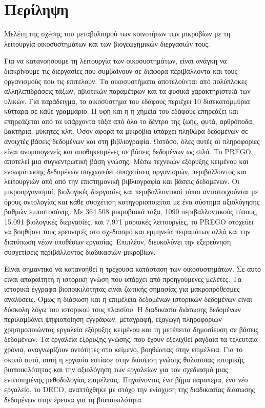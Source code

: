 \documentclass[11pt]{article}
\begin{document}
\section*{Περίληψη}
{\LARGE Μελέτη της σχέσης του μεταβολισμού των κοινοτήτων των μικροβίων με τη λειτουργία οικοσυστημάτων και των βιογεωχημικών διεργασιών τους.}


\vspace{1cm}

Για να κατανοήσουμε τη λειτουργία των οικοσυστημάτων, είναι ανάγκη να διακρίνουμε
τις διεργασίες που συμβαίνουν σε διάφορα περιβάλλοντα και τους οργανισμούς
που τις επιτελούν. Τα οικοσυστήματα αποτελούνται από πολύπλοκες αλληλεπιδράσεις τάξων,
αβιοτικών παραμέτρων και τα φυσικά χαρακτηριστικά των υλικών. Για παράδειγμα,
το οικοσύστημα του εδάφους περιέχει 10 δισεκατομμύρια κύτταρα σε κάθε γραμμάριο. Η υφή και η
η χημεία του εδάφους επηρεάζει και επηρεάζεται από τα υπάρχοντα τάξα από όλο το
δέντρο της ζωής, φυτά, αρθρόποδα, βακτήρια, μύκητες κλπ. Όσον αφορά τα μικρόβια
υπάρχει πληθώρα δεδομένων σε ανοιχτές βάσεις δεδομένων και στη
βιβλιογραφία. Ωστόσο, όλες αυτές οι πληροφορίες είναι ανομοιογενείς και αποθηκευμένες σε 
βάσεις δεδομένων ως σιλό. Το \textlatin{PREGO}, αποτελεί μια συγκεντρωτική βάση γνώσης. Μέσω
τεχνικών εξόρυξης κειμένου και ενσωμάτωσης δεδομένων συγχωνεύει 
συσχετίσεις οργανισμών, περιβάλλοντος και λειτουργιών από
από την επιστημονική βιβλιογραφία και βάσεις δεδομένων. 
Οι μικροοργανισμοί, βιολογικές διεργασίες και περιβαλλοντικοί τύποι αντιστοιχούνται
με όρους οντολογίας και κάθε συσχέτιση κατηγοριοποιείται με ένα σύστημα αξιολόγησης 
βαθμών εμπιστοσύνης.
Με 364.508 μικροβιακά τάξα, 1090 περιβαλλοντικούς τύπους, 15.091 βιολογικές διεργασίες,
και 7.971 μοριακές λειτουργίες, το \textlatin{PREGO} στοχεύει να βοηθήσει τους ερευνητές στο 
σχεδιασμό και ερμηνεία πειραμάτων αλλά και την διατύπωση νέων υποθέσων εργασίας. Επιπλέον, διευκολύνει την εξερεύνηση
συσχετίσεις περιβάλλοντος-διαδικασιών-μικροβίων.

Είναι σημαντικό να κατανοήθεί η τρέχουσα κατάσταση των οικοσυστημάτων. Σε αυτό είναι
απαραίτητη η ιστορική γνώση που υπάρχει από προηγούμενες μελέτες.
Τα ιστορικά έγγραφα βιοποικιλότητας είναι ζωτικής σημασίας για
μακροπρόθεσμες αναλύσεις. Όμως η διάσωση και η επιμέλεια δεδομένων ιστορικών δεδομένων είναι δύσκολη λόγω του ιστορικού τους
πλαισίου. Η διαδικασία διάσωσης δεδομένων περιλαμβάνει ψηφιοποίηση εγγράφων, μεταγραφή, εξαγωγή πληροφοριών
χρησιμοποιώντας εργαλεία εξόρυξης κειμένου και τη μετέπειτα δημοσίευση σε βάσεις δεδομένων.
Τα εργαλεία εξόρυξης γνώσης, που έχουν εξελιχθεί ραγδαία τα τελευταία χρόνια,
αναγνωρίζουν οντότητες στο κείμενο, βοηθώντας στην επιμέλεια.
Για το σκοπό αυτό, αυτή η εργασία εστίασε στην διάσωση γνώσης θαλάσσιας ιστορικής βιοποικιλότητας και την
αξιολόγηση των εργαλείων για τον σχεδιασμό μιας ενοποιημένης μεθοδολογίας επιμέλειας. 
Πηγαίνοντας ένα βήμα παραπέρα, ένα νέο εργαλείο, το \textlatin{DECO}, αναπτύχθηκε
με στόχο την ενίσχυση της διαδικασίας διάσωσης δεδομένων στην έρευνα για τη βιοποικιλότητα.
\end{document}
